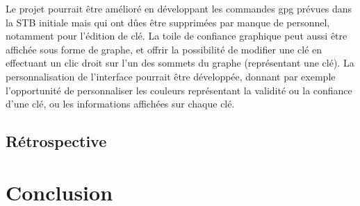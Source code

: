 \documentclass{../res/univ-projet}
\begin{document}
    Le projet pourrait être amélioré en développant les commandes gpg prévues dans la STB initiale mais qui ont dûes être supprimées par manque de personnel, notamment pour l'édition de clé. 
    La toile de confiance graphique peut aussi être affichée sous forme de graphe, et offrir la possibilité de modifier une clé en effectuant un clic droit sur l'un des sommets du graphe (représentant une clé).
    La personnalisation de l'interface pourrait être développée, donnant par exemple l'opportunité de personnaliser les couleurs représentant la validité ou la confiance d'une clé, ou les informations affichées sur chaque clé.

  \subsection{Rétrospective}



\section{Conclusion}
\end{document}
